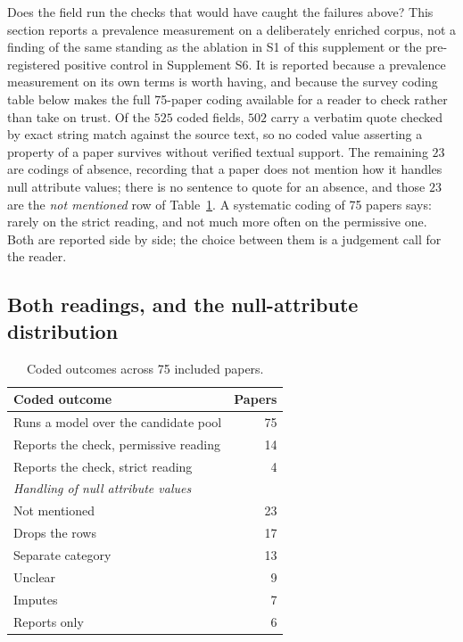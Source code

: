 Does the field run the checks that would have caught the failures above? This
section reports a prevalence measurement on a deliberately enriched corpus, not
a finding of the same standing as the ablation in
S1 of this supplement or the pre-registered positive control in
Supplement S6. It is reported because a prevalence measurement on
its own terms is worth having, and because the survey coding table below makes
the full 75-paper coding available for a reader to check rather than take on
trust. Of the $525$ coded fields, $502$ carry a verbatim quote checked by exact string match
against the source text, so no coded value asserting a property of a paper survives without
verified textual support. The remaining $23$ are codings of absence, recording that a paper does
not mention how it handles null attribute values; there is no sentence to quote for an absence,
and those $23$ are the \emph{not mentioned} row of Table~\ref{sup:tab:survey}. A systematic coding of 75 papers says: rarely on the strict
reading, and not much more often on the permissive one. Both are reported side by side; the
choice between them is a judgement call for the reader.

\subsection{Both readings, and the null-attribute distribution}

\begin{table}[H]
\caption[Coded outcomes across surveyed papers]{Coded outcomes across 75 included papers.}
\centering
\small
\begin{tabular}{lr}
\toprule
\textbf{Coded outcome} & \textbf{Papers} \\
\midrule
Runs a model over the candidate pool  & 75 \\
Reports the check, permissive reading & 14 \\
Reports the check, strict reading     & 4  \\
\midrule
\multicolumn{2}{l}{\textit{Handling of null attribute values}} \\
Not mentioned     & 23 \\
Drops the rows    & 17 \\
Separate category & 13 \\
Unclear           & 9  \\
Imputes           & 7  \\
Reports only      & 6  \\
\bottomrule
\end{tabular}
\label{sup:tab:survey}
\end{table}

